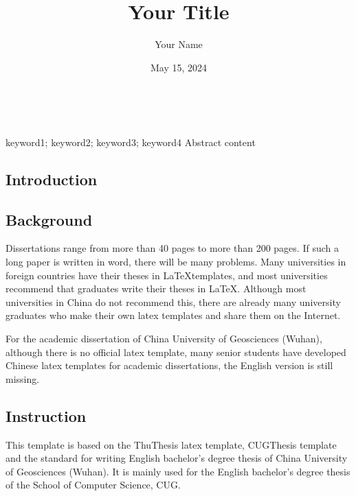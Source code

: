 \documentclass[twoside]{CUGCSthesis_EN}
\title{Your Title} %
\author{Your Name} %
\date{May 15, 2024} %
\begin{document}
	\maketitle
	\makestatement\

	
	\begin{enabstract}{keyword1; keyword2; keyword3; keyword4}
		Abstract content
	\end{enabstract}
	
	\makeToc
	
	
	\begin{spacing}{2}
		\section{Introduction}
	\end{spacing}

	\subsection{Background}
	Dissertations range from more than 40 pages to more than 200 pages. If such a long paper is written in word, there will be many problems.
	Many universities in foreign countries have their theses in \LaTeX templates, and most universities recommend that graduates write their theses in \LaTeX.
	Although most universities in China do not recommend this, there are already many university graduates who make their own latex templates and 
	share them on the Internet.

	For the academic dissertation of China University of Geosciences (Wuhan), although there is no official latex template, many senior students 
	have developed Chinese latex templates for academic dissertations, the English version is still missing.

	\subsection{Instruction}
	This template is based on the ThuThesis latex template, CUGThesis template and the standard for writing English bachelor's degree thesis of China 
	University of Geosciences (Wuhan). It is mainly used for the English bachelor's degree thesis of the School of Computer Science, CUG.
\end{document}
